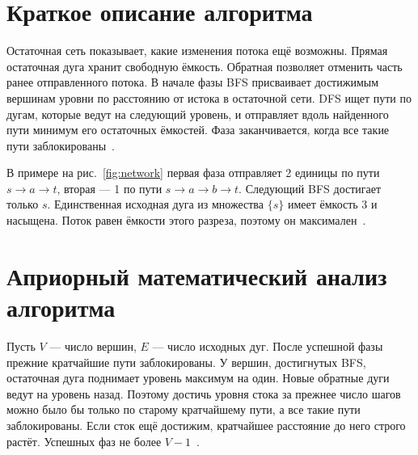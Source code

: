 \documentclass[14pt,a4paper]{extarticle}
\begin{document}
\section{Краткое описание алгоритма}

Остаточная сеть показывает, какие изменения потока ещё возможны. Прямая остаточная дуга хранит свободную ёмкость. Обратная позволяет отменить часть ранее отправленного потока. В начале фазы BFS присваивает достижимым вершинам уровни по расстоянию от истока в остаточной сети. DFS ищет пути по дугам, которые ведут на следующий уровень, и отправляет вдоль найденного пути минимум его остаточных ёмкостей. Фаза заканчивается, когда все такие пути заблокированы~\cite{dinic,williamson}.

В примере на рис.~\ref{fig:network} первая фаза отправляет 2 единицы по пути $s \to a \to t$, вторая --- 1 по пути $s \to a \to b \to t$. Следующий BFS достигает только $s$. Единственная исходная дуга из множества $\{s\}$ имеет ёмкость 3 и насыщена. Поток равен ёмкости этого разреза, поэтому он максимален~\cite{sedgewick}.

\begin{center}
\label{fig:network}
\end{center}

\clearpage
\section{Априорный математический анализ алгоритма}

Пусть $V$ --- число вершин, $E$ --- число исходных дуг. После успешной фазы прежние кратчайшие пути заблокированы. У вершин, достигнутых BFS, остаточная дуга поднимает уровень максимум на один. Новые обратные дуги ведут на уровень назад. Поэтому достичь уровня стока за прежнее число шагов можно было бы только по старому кратчайшему пути, а все такие пути заблокированы. Если сток ещё достижим, кратчайшее расстояние до него строго растёт. Успешных фаз не более $V-1$~\cite{dinic,williamson}.
\end{document}

